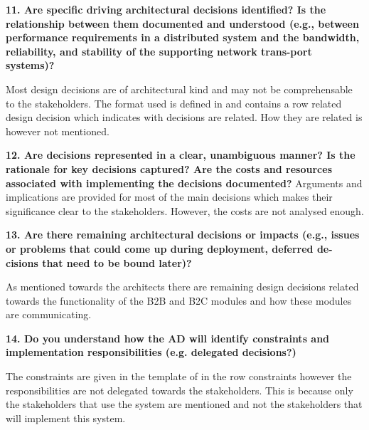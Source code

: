 \vspace{.5cm}
\textbf{11. Are specific driving architectural decisions identified? Is the relationship between them documented and understood (e.g., between performance requirements in a distributed system and the bandwidth, reliability, and stability of the supporting network trans-port systems)?}

Most design decisions are of architectural kind and may not be comprehensable to the stakeholders. The format used is defined in \cite{tyree} and contains a row related design decision which indicates with decisions are related. How they are related is however not mentioned.

\vspace{.5cm}
\textbf{12. Are decisions represented in a clear, unambiguous manner? Is the rationale for key decisions captured? Are the costs and resources associated with implementing the decisions documented?}
Arguments and implications are provided for most of the main decisions which makes their significance clear to the stakeholders. However, the costs are not analysed enough.

\vspace{.5cm}
\textbf{13. Are there remaining architectural decisions or impacts (e.g., issues or problems that could come up during deployment, deferred de-cisions that need to be bound later)?}

As mentioned towards the architects there are remaining design decisions related towards the functionality of the B2B and B2C modules and how these modules are communicating.

\vspace{.5cm}
\textbf{14. Do you understand how the AD will identify constraints and implementation responsibilities (e.g. delegated decisions?)}

The constraints are given in the template of \cite{clemens} in the row constraints however the responsibilities are not delegated towards the stakeholders. This is because only the stakeholders that use the system are mentioned and not the stakeholders that will implement this system. 
